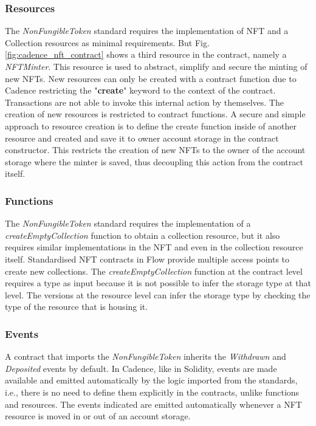 \documentclass[../NFTComp_IEEE.tex]{subfiles}
\begin{document}
\subsubsection{Resources}
The \textit{NonFungibleToken} standard requires the implementation of NFT and a Collection resources as minimal requirements. But Fig. \ref{fig:cadence_nft_contract} shows a third resource in the contract, namely a \textit{NFTMinter}. This resource is used to abstract, simplify and secure the minting of new NFTs. New resources can only be created with a contract function due to Cadence restricting the "\textbf{create}" keyword to the context of the contract. Transactions are not able to invoke this internal action by themselves. The creation of new resources is restricted to contract functions. A secure and simple approach to resource creation is to define the create function inside of another resource and created and save it to owner account storage in the contract constructor. This restricts the creation of new NFTs to the owner of the account storage where the minter is saved, thus decoupling this action from the contract itself.

\subsubsection{Functions}
The \textit{NonFungibleToken} standard requires the implementation of a \textit{createEmptyCollection} function to obtain a collection resource, but it also requires similar implementations in the NFT and even in the collection resource itself. Standardised NFT contracts in Flow provide multiple access points to create new collections. The \textit{createEmptyCollection} function at the contract level requires a type as input because it is not possible to infer the storage type at that level. The versions at the resource level can infer the storage type by checking the type of the resource that is housing it.

\subsubsection{Events}
A contract that imports the \textit{NonFungibleToken} inherits the \textit{Withdrawn} and \textit{Deposited} events by default. In Cadence, like in Solidity, events are made available and emitted automatically by the logic imported from the standards, i.e., there is no need to define them explicitly in the contracts, unlike functions and resources. The events indicated are emitted automatically whenever a NFT resource is moved in or out of an account storage.
\end{document}
